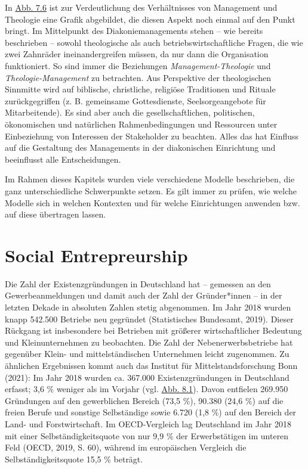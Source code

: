 \documentclass[
  letterpaper,
]{book}
\begin{document}
In \hyperref[figure76]{Abb. 7.6} ist zur Verdeutlichung des
Verhältnisses von Management und Theologie eine Grafik abgebildet, die
diesen Aspekt noch einmal auf den Punkt bringt. Im Mittelpunkt des
Diakoniemanagements stehen -- wie bereits beschrieben -- sowohl
theologische als auch betriebswirtschaftliche Fragen, die wie zwei
Zahnräder ineinandergreifen müssen, da nur dann die Organisation
funktioniert. So sind immer die Beziehungen \emph{Management-Theologie}
und \emph{Theologie-Management} zu betrachten. Aus Perspektive der
theologischen Sinnmitte wird auf biblische, christliche, religiöse
Traditionen und Rituale zurückgegriffen (z. B. gemeinsame Gottesdienste,
Seelsorgeangebote für Mitarbeitende). Es sind aber auch die
gesellschaftlichen, politischen, ökonomischen und natürlichen
Rahmenbedingungen und Ressourcen unter Einbeziehung von Interessen der
Stakeholder zu beachten. Alles das hat Einfluss auf die Gestaltung des
Managements in der diakonischen Einrichtung und beeinflusst alle
Entscheidungen.

Im Rahmen dieses Kapitels wurden viele verschiedene Modelle beschrieben,
die ganz unterschiedliche Schwerpunkte setzen. Es gilt immer zu prüfen,
wie welche Modelle sich in welchen Kontexten und für welche
Einrichtungen anwenden bzw. auf diese übertragen lassen.

\chapter{Social Entrepreurship}\label{social-entrepreneurship}

Die Zahl der Existenzgründungen in Deutschland hat -- gemessen an den
Gewerbeanmeldungen und damit auch der Zahl der Gründer*innen -- in der
letzten Dekade in absoluten Zahlen stetig abgenommen. Im Jahr 2018
wurden knapp 542.500 Betriebe neu gegründet (Statistisches Bundesamt,
2019). Dieser Rückgang ist insbesondere bei Betrieben mit größerer
wirtschaftlicher Bedeutung und Kleinunternehmen zu beobachten. Die Zahl
der Nebenerwerbsbetriebe hat gegenüber Klein- und mittelständischen
Unternehmen leicht zugenommen. Zu ähnlichen Ergebnissen kommt auch das
Institut für Mittelstandsforschung Bonn (2021): Im Jahr 2018 wurden ca.
367.000 Existenzgründungen in Deutschland erfasst; 3,6 \% weniger als im
Vorjahr (vgl. \hyperref[figure81]{Abb. 8.1}). Davon entfielen 269.950
Gründungen auf den gewerblichen Bereich (73,5 \%), 90.380 (24,6 \%) auf
die freien Berufe und sonstige Selbständige sowie 6.720 (1,8 \%) auf den
Bereich der Land- und Forstwirtschaft. Im OECD-Vergleich lag Deutschland
im Jahr 2018 mit einer Selbständigkeitsquote von nur 9,9 \% der
Erwerbstätigen im unteren Feld (OECD, 2019, S. 60), während im
europäischen Vergleich die Selbständigkeitsquote 15,5 \% beträgt.
\end{document}
